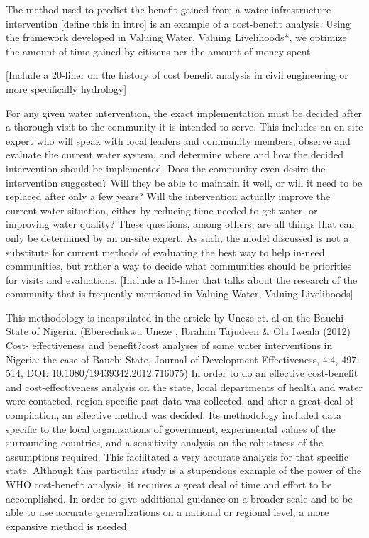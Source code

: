 The method used to predict the benefit gained from a water infrastructure intervention [define this in intro] is an example of a cost-benefit analysis. Using the framework developed in Valuing Water, Valuing Livelihoods*, we optimize the amount of time gained by citizens per the amount of money spent.

[Include a 20-liner on the history of cost benefit analysis in civil engineering or more specifically hydrology]

For any given water intervention, the exact implementation must be decided after a thorough visit to the community it is intended to serve.
This includes an on-site expert who will speak with local leaders and community members, observe and evaluate the current water system, and determine where and how the decided intervention should be implemented.
Does the community even desire the intervention suggested?
Will they be able to maintain it well, or will it need to be replaced after only a few years?
Will the intervention actually improve the current water situation, either by reducing time needed to get water, or improving water quality?
These questions, among others, are all things that can only be determined by an on-site expert.
As such, the model discussed is not a substitute for current methods of evaluating the best way to help in-need communities, but rather a way to decide what communities should be priorities for visits and evaluations.
[Include a 15-liner that talks about the research of the community that is frequently mentioned in Valuing Water, Valuing Livelihoods]

This methodology is incapsulated in the article by Uneze et. al on the Bauchi State of Nigeria. (Eberechukwu Uneze , Ibrahim Tajudeen & Ola Iweala (2012) Cost- effectiveness and benefit?cost analyses of some water interventions in Nigeria: the case of Bauchi State, Journal of Development Effectiveness, 4:4, 497-514, DOI: 10.1080/19439342.2012.716075)
In order to do an effective cost-benefit and cost-effectiveness analysis on the state, local departments of health and water were contacted, region specific past data was collected, and after a great deal of compilation, an effective method was decided.
Its methodology included data specific to the local organizations of government, experimental values of the surrounding countries, and a sensitivity analysis on the robustness of the assumptions required.
This facilitated a very accurate analysis for that specific state.
Although this particular study is a stupendous example of the power of the WHO cost-benefit analysis, it requires a great deal of time and effort to be accomplished.
In order to give additional guidance on a broader scale and to be able to use accurate generalizations on a national or regional level, a more expansive method is needed.